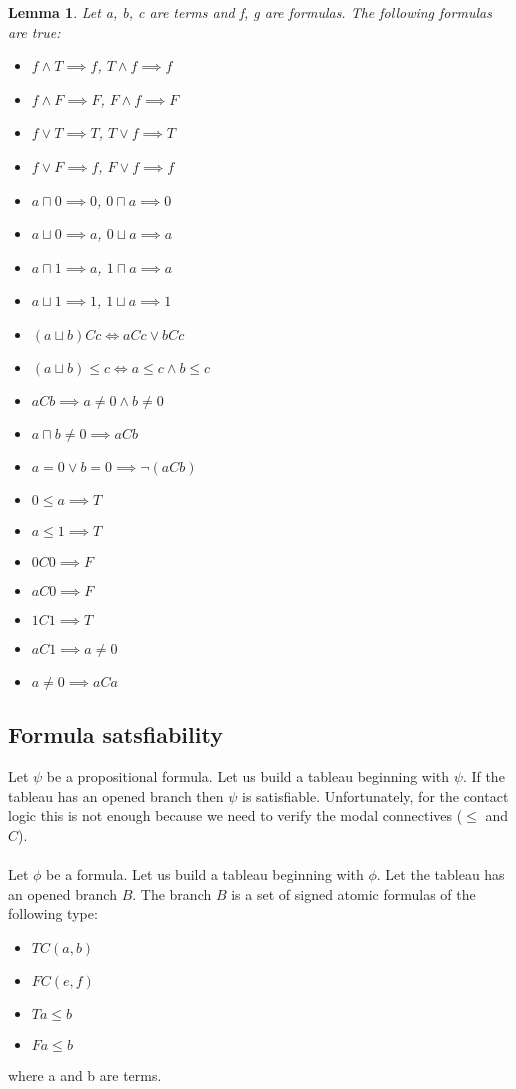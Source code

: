 \documentclass{article}
\newtheorem{lemma}[theorem]{Lemma}
\begin{document}
	\begin{lemma}
		Let a, b, c are terms and f, g are formulas. The following formulas are true:
		\begin{itemize}
			\item $f \land T \implies f$, $T \land f \implies f$
			\item $f \land F \implies F$, $F \land f \implies F$
			\item $f \lor T \implies T$, $T \lor f \implies T$
			\item $f \lor F \implies f$, $F \lor f \implies f$
			\item $a \sqcap 0 \implies 0$, $0 \sqcap a \implies 0$
			\item $a \sqcup 0 \implies a$, $0 \sqcup a \implies a$
			\item $a \sqcap 1 \implies a$, $1 \sqcap a \implies a$
			\item $a \sqcup 1 \implies 1$, $1 \sqcup a \implies 1$
			\item $(a \sqcup b)Cc \iff aCc \lor bCc$
			\item $(a \sqcup b) \leq c \iff a \leq c \land b \leq c$
			\item $aCb \implies a \neq 0 \land b \neq 0$
			\item $a \sqcap b \neq 0 \implies aCb$
			\item $a = 0 \lor b = 0 \implies \neg(aCb)$
			\item $0 \leq a \implies T$
			\item $a \leq 1 \implies T$
			\item $0C0 \implies F$
			\item $aC0 \implies F$
			\item $1C1 \implies T$
			\item $aC1 \implies a \neq 0$
			\item $a \neq 0 \implies aCa$
		\end{itemize}
	\end{lemma}

	\subsection{Formula satsfiability}
		Let $\psi$ be a propositional formula. Let us build a tableau beginning with $\psi$. If the tableau has an opened branch then $\psi$ is satisfiable. Unfortunately, for the contact logic this is not enough because we need to verify the modal connectives ($\leq$ and $C$).
		\paragraph{}
		Let $\phi$ be a formula. Let us build a tableau beginning with $\phi$. Let the tableau has an opened branch $B$. The branch $B$ is a set of signed atomic formulas of the following type:
		\begin{itemize}
			\item $T C(a,b)$
			\item $F C(e,f)$
			\item $T a \leq b$
			\item $F a \leq b$
		\end{itemize}
		where a and b are terms.
\end{document}
